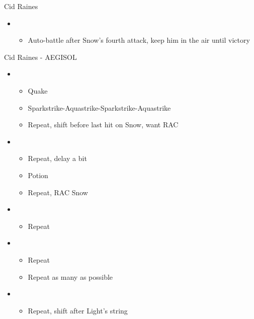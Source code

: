 \begin{battle}[1:35]{Cid Raines}
\begin{itemize}
\begin{itemize}
				      \item Repeat to maintain interruption
				      \item Potion twice if can't stagger before next Cid attack
				      \item RAC Snow after \stagger
			      \end{itemize}
			\item \sixth
			      \begin{itemize}
				      \item Auto-battle after Snow's fourth attack, keep him in the air until victory
			      \end{itemize}
		\end{itemize}
	\end{battle}
	
	\begin{battle}[1:25]{Cid Raines - AEGISOL}
	\begin{itemize}
	\renewcommand{\fourth}{[4] Aggression (\com/\com/\rav)}
			\item \first
			      \begin{itemize}
				      \item Quake
				      \item Sparkstrike-Aquastrike-Sparkstrike-Aquastrike
				      \item Repeat, shift before last hit on Snow, want RAC
			      \end{itemize}
			\item \second
			      \begin{itemize}
				      \item Repeat, delay a bit
				      \item Potion
				      \item Repeat, RAC Snow
			      \end{itemize}
			\item \third
			      \begin{itemize}
				      \item Repeat
			      \end{itemize}
			\item \second
			      \begin{itemize}
				      \item Repeat
				      \item Repeat as many as possible
			      \end{itemize}
			\item \third
			      \begin{itemize}
				      \item Repeat, shift after Light's string

\end{itemize}
\end{itemize}
\end{battle}
